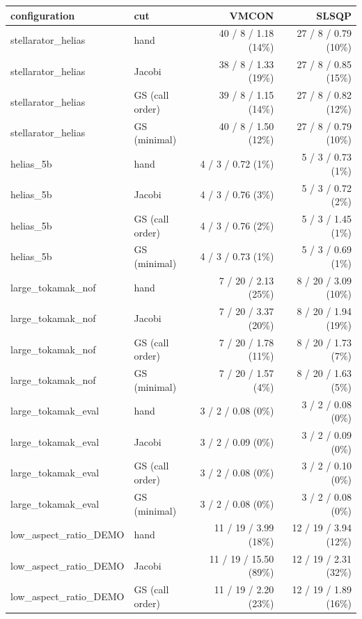 \begin{tabular}{llrr}
\toprule
configuration & cut & VMCON & SLSQP \\
\midrule
stellarator\_helias & hand & 40 / 8 / 1.18 (14\%) & 27 / 8 / 0.79 (10\%) \\
stellarator\_helias & Jacobi & 38 / 8 / 1.33 (19\%) & 27 / 8 / 0.85 (15\%) \\
stellarator\_helias & GS (call order) & 39 / 8 / 1.15 (14\%) & 27 / 8 / 0.82 (12\%) \\
stellarator\_helias & GS (minimal) & 40 / 8 / 1.50 (12\%) & 27 / 8 / 0.79 (10\%) \\
helias\_5b & hand & 4 / 3 / 0.72 (1\%) & 5 / 3 / 0.73 (1\%) \\
helias\_5b & Jacobi & 4 / 3 / 0.76 (3\%) & 5 / 3 / 0.72 (2\%) \\
helias\_5b & GS (call order) & 4 / 3 / 0.76 (2\%) & 5 / 3 / 1.45 (1\%) \\
helias\_5b & GS (minimal) & 4 / 3 / 0.73 (1\%) & 5 / 3 / 0.69 (1\%) \\
large\_tokamak\_nof & hand & 7 / 20 / 2.13 (25\%) & 8 / 20 / 3.09 (10\%) \\
large\_tokamak\_nof & Jacobi & 7 / 20 / 3.37 (20\%) & 8 / 20 / 1.94 (19\%) \\
large\_tokamak\_nof & GS (call order) & 7 / 20 / 1.78 (11\%) & 8 / 20 / 1.73 (7\%) \\
large\_tokamak\_nof & GS (minimal) & 7 / 20 / 1.57 (4\%) & 8 / 20 / 1.63 (5\%) \\
large\_tokamak\_eval & hand & 3 / 2 / 0.08 (0\%) & 3 / 2 / 0.08 (0\%) \\
large\_tokamak\_eval & Jacobi & 3 / 2 / 0.09 (0\%) & 3 / 2 / 0.09 (0\%) \\
large\_tokamak\_eval & GS (call order) & 3 / 2 / 0.08 (0\%) & 3 / 2 / 0.10 (0\%) \\
large\_tokamak\_eval & GS (minimal) & 3 / 2 / 0.08 (0\%) & 3 / 2 / 0.08 (0\%) \\
low\_aspect\_ratio\_DEMO & hand & 11 / 19 / 3.99 (18\%) & 12 / 19 / 3.94 (12\%) \\
low\_aspect\_ratio\_DEMO & Jacobi & 11 / 19 / 15.50 (89\%) & 12 / 19 / 2.31 (32\%) \\
low\_aspect\_ratio\_DEMO & GS (call order) & 11 / 19 / 2.20 (23\%) & 12 / 19 / 1.89 (16\%) \\

\end{tabular}
